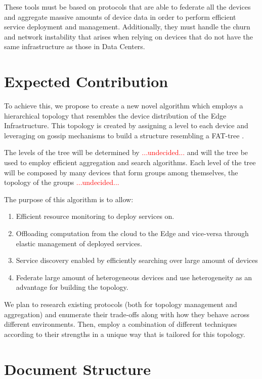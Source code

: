These tools must be based on protocols that are able to federate all the devices and aggregate massive amounts of device data in order to perform efficient service deployment and management. Additionally, they must handle the churn and network instability that arises when relying on devices that do not have the same infrastructure as those in Data Centers.

\section{Expected Contribution}

To achieve this, we propose to create a new novel algorithm which employs a hierarchical topology
that resembles the device distribution of the Edge Infrastructure. This topology is created by
assigning a level to each device and leveraging on gossip mechanisms to build a structure resembling a FAT-tree \cite{}.

The levels of the tree will be determined by \textcolor{red}{...undecided...} and will the tree be used to employ efficient aggregation and search algorithms. Each level of the tree will be composed by many devices that form groups among themselves, the topology of the groups \textcolor{red}{...undecided...} 

The purpose of this algorithm is to allow:

\begin{enumerate} 
    \item Efficient resource monitoring to deploy services on.
    \item Offloading computation from the cloud to the Edge and vice-versa through elastic management of deployed services.
    \item Service discovery enabled by efficiently searching over large amount of devices
    \item Federate large amount of heterogeneous devices and use heterogeneity as an advantage for building the topology.
\end{enumerate}

We plan to research existing protocols (both for topology management and aggregation) and enumerate their trade-offs along with how they behave across different environments. Then, employ a combination of different techniques according to their strengths in a unique way that is tailored for this topology.

\section{Document Structure}

